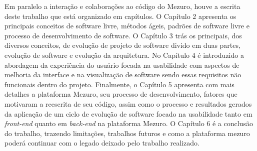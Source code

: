 Em paralelo a interação e colaborações ao código do Mezuro, houve a escrita deste trabalho que está organizado em capítulos. O Capítulo 2 apresenta os principais conceitos de software livre, métodos ágeis, padrões de software livre e processo de desenvolvimento de software. O Capítulo 3 trás os principais, dos diversos conceitos, de evolução de projeto de software divido em duas partes, evolução de software e evolução da arquitetura. No Capítulo 4 é introduzido a abordagem da experiência do usuário focada na usabilidade com aspectos de melhoria da interface e na visualização de software sendo essas requisitos não funcionais dentro do projeto. Finalmente, o Capítulo 5 apresenta com mais detalhes a plataforma Mezuro, seu processo de desenvolvimento, fatores que motivaram a reescrita de seu código, assim como o processo e resultados gerados da aplicação de um ciclo de evolução de software focado na usabilidade tanto em \textit{front-end} quanto em \textit{back-end} na plataforma Mezuro. O Capítulo 6 é a conclusão do trabalho, trazendo limitações, trabalhos futuros e como a plataforma mezuro poderá continuar com o legado deixado pelo trabalho realizado.

